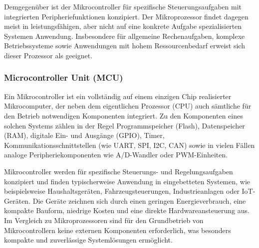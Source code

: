 Demgegenüber ist der Mikrocontroller für spezifische Steuerungsaufgaben mit integrierten Peripheriefunktionen konzipiert. 
Der Mikroprozessor findet dagegen meist in leistungsfähigen, aber nicht auf eine konkrete Aufgabe spezialisierten Systemen Anwendung. 
Insbesondere für allgemeine Rechenaufgaben, komplexe Betriebssysteme sowie Anwendungen mit hohem Ressourcenbedarf erweist sich dieser Prozessor als geeignet.

\subsubsection*{Microcontroller Unit (MCU)}
Ein Mikrocontroller ist ein vollständig auf einem einzigen Chip realisierter Mikrocomputer, der neben dem eigentlichen Prozessor (CPU) auch sämtliche für den Betrieb notwendigen Komponenten integriert. 
Zu den Komponenten eines solchen Systems zählen in der Regel Programmspeicher (Flash), Datenspeicher (RAM), digitale Ein- und Ausgänge (GPIO), Timer, Kommunikationsschnittstellen (wie UART, SPI, I2C, CAN) sowie in vielen Fällen analoge Peripheriekomponenten wie A/D-Wandler oder PWM-Einheiten.

Mikrocontroller werden für spezifische Steuerungs- und Regelungsaufgaben konzipiert und finden typischerweise Anwendung in eingebetteten Systemen, wie beispielsweise Haushaltsgeräten, Fahrzeugsteuerungen, Industrieanlagen oder IoT-Geräten. 
Die Geräte zeichnen sich durch einen geringen Energieverbrauch, eine kompakte Bauform, niedrige Kosten und eine direkte Hardwareansteuerung aus. 
Im Vergleich zu Mikroprozessoren sind für den Grundbetrieb von Mikrocontrollern keine externen Komponenten erforderlich, was besonders kompakte und zuverlässige Systemlösungen ermöglicht.

